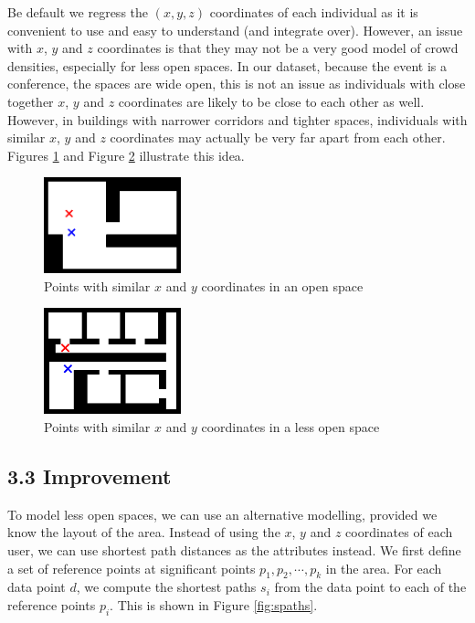 \documentclass[letterpaper]{article}
\begin{document}
Be default we regress the $(x,y,z)$ coordinates of each individual as it is convenient to use and easy to understand (and integrate over). However, an issue with $x$, $y$ and $z$ coordinates is that they may not be a very good model of crowd densities, especially for less open spaces. In our dataset, because the event is a conference, the spaces are wide open, this is not an issue as individuals with close together $x$, $y$ and $z$ coordinates are likely to be close to each other as well. However, in buildings with narrower corridors and tighter spaces, individuals with similar $x$, $y$ and $z$ coordinates may actually be very far apart from each other. Figures \ref{fig:opspace1} and Figure \ref{fig:opspace2} illustrate this idea.

\begin{figure}[h!]
  \centering
    \includegraphics[width=150px,natwidth=634,natheight=442]{openspace1.png}
  \caption{Points with similar $x$ and $y$ coordinates in an open space}
  \label{fig:opspace1}
\end{figure}

\begin{figure}[h!]
  \centering
    \includegraphics[width=150px,natwidth=570,natheight=402]{openspace2.png}
  \caption{Points with similar $x$ and $y$ coordinates in a less open space}
  \label{fig:opspace2}
\end{figure}

\subsection{3.3  Improvement}

To model less open spaces, we can use an alternative modelling, provided we know the layout of the area. Instead of using the $x$, $y$ and $z$ coordinates of each user, we can use shortest path distances as the attributes instead. We first define a set of reference points at significant points $p_1,p_2,\cdots,p_k$ in the area. For each data point $d$, we compute the shortest paths $s_i$ from the data point to each of the reference points $p_i$. This is shown in Figure \ref{fig:spaths}. \\
\end{document}
